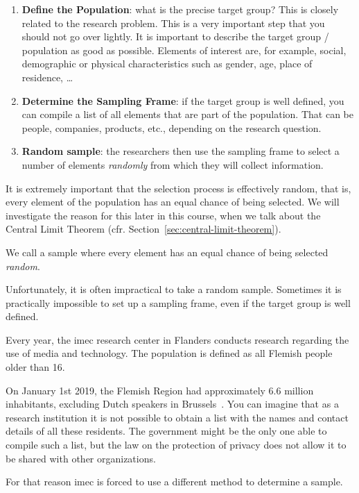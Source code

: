 \begin{enumerate}
    \item \textbf{Define the Population}: what is the precise target group? This is closely related to the research problem. This is a very important step that you should not go over lightly. It is important to describe the target group / population as good as possible. Elements of interest are, for example, social, demographic or physical characteristics such as gender, age, place of residence, \dots
    \item \textbf{Determine the Sampling Frame}: if the target group is well defined, you can compile a list of all elements that are part of the population. That can be people, companies, products, etc., depending on the research question.
    \item \textbf{Random sample}: the researchers then use the sampling frame to select a number of elements \textit{randomly} from which they will collect information.
\end{enumerate}

It is extremely important that the selection process is effectively random, that is, every element of the population has an equal chance of being selected. We will investigate the reason for this later in this course, when we talk about the Central Limit Theorem (cfr. Section~\ref{sec:central-limit-theorem}).

\begin{definition}
    We call a sample where every element has an equal chance of being selected \emph{random}.
\end{definition}

Unfortunately, it is often impractical to take a random sample. Sometimes it is practically impossible to set up a sampling frame, even if the target group is well defined.

\begin{example}
    Every year, the imec research center in Flanders conducts research regarding the use of media and technology. The population is defined as all Flemish people older than 16. 
    
    On January 1st 2019, the Flemish Region had approximately 6.6 million inhabitants, excluding Dutch speakers in Brussels~\autocite{Statbel2019}. You can imagine that as a research institution it is not possible to obtain a list with the names and contact details of all these residents. The government might be the only one able to compile such a list, but the law on the protection of privacy does not allow it to be shared with other organizations.
    
    For that reason imec is forced to use a different method to determine a sample.
\end{example}

